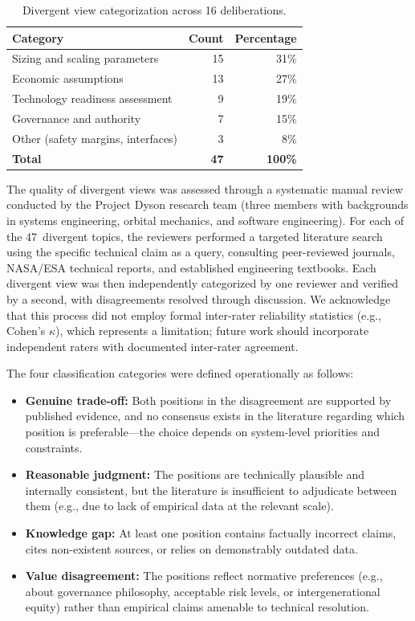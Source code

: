 \documentclass[11pt,a4paper]{article}
\begin{document}
\begin{table}[ht]
\centering
\caption{Divergent view categorization across 16 deliberations.}
\label{tab:divergent}
\begin{tabular}{@{}lrr@{}}
\toprule
\textbf{Category} & \textbf{Count} & \textbf{Percentage} \\
\midrule
Sizing and scaling parameters & 15 & 31\% \\
Economic assumptions & 13 & 27\% \\
Technology readiness assessment & 9 & 19\% \\
Governance and authority & 7 & 15\% \\
Other (safety margins, interfaces) & 3 & 8\% \\
\midrule
\textbf{Total} & \textbf{47} & \textbf{100\%} \\
\bottomrule
\end{tabular}
\end{table}

The quality of divergent views was assessed through a systematic manual review conducted by the Project Dyson research team (three members with backgrounds in systems engineering, orbital mechanics, and software engineering). For each of the 47~divergent topics, the reviewers performed a targeted literature search using the specific technical claim as a query, consulting peer-reviewed journals, NASA/ESA technical reports, and established engineering textbooks. Each divergent view was then independently categorized by one reviewer and verified by a second, with disagreements resolved through discussion. We acknowledge that this process did not employ formal inter-rater reliability statistics (e.g., Cohen's $\kappa$), which represents a limitation; future work should incorporate independent raters with documented inter-rater agreement.

The four classification categories were defined operationally as follows:

\begin{itemize}[nosep]
    \item \textbf{Genuine trade-off:} Both positions in the disagreement are supported by published evidence, and no consensus exists in the literature regarding which position is preferable---the choice depends on system-level priorities and constraints.
    \item \textbf{Reasonable judgment:} The positions are technically plausible and internally consistent, but the literature is insufficient to adjudicate between them (e.g., due to lack of empirical data at the relevant scale).
    \item \textbf{Knowledge gap:} At least one position contains factually incorrect claims, cites non-existent sources, or relies on demonstrably outdated data.
    \item \textbf{Value disagreement:} The positions reflect normative preferences (e.g., about governance philosophy, acceptable risk levels, or intergenerational equity) rather than empirical claims amenable to technical resolution.
\end{itemize}
\end{document}

